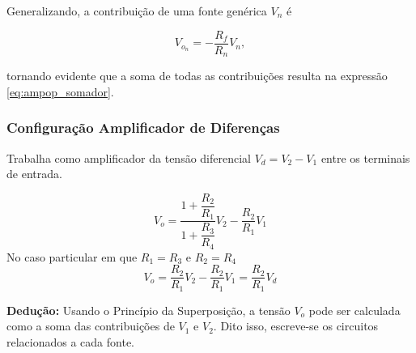 \documentclass{article}
\numberwithin{equation}{section}
\let\dfr\dfrac
\begin{document}
Generalizando, a contribuição de uma fonte genérica $V_n$ é

\begin{equation}
    V_{o_n} = - \dfr{R_f}{R_n}V_n,
\end{equation}

\noindent tornando evidente que a soma de todas as contribuições resulta na expressão \eqref{eq:ampop_somador}.

\subsubsection{Configuração Amplificador de Diferenças}
Trabalha como amplificador da tensão diferencial $V_{d}=V_{2}-V_{1}$ entre os terminais de entrada.

\begin{center}
\end{center}

\begin{equation*}
    V_{o}=\frac{1+\dfr{R_{2}}{R_{1}}}{1+\dfr{R_{3}}{R_{4}}}V_{2} - \dfr{R_{2}}{R_{1}}V_{1}
\end{equation*}
No caso particular em que $R_{1}=R_{3}$ e $R_{2}=R_{4}$
\begin{equation}
    V_{o}=\frac{R_{2}}{R_{1}}V_{2}-\frac{R_{2}}{R_{1}}V_{1}=\frac{R_{2}}{R_{1}}V_{d} \label{eq:ampop_diferencas}
\end{equation}

\textbf{Dedução:} Usando o Princípio da Superposição, a tensão $V_o$ pode ser calculada como a soma das contribuições de $V_1$ e $V_2$. Dito isso, escreve-se os circuitos relacionados a cada fonte.
\end{document}
